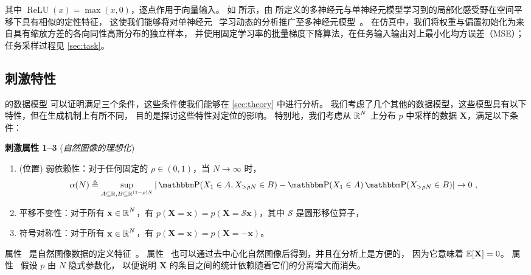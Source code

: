 其中 $\operatorname{ReLU}(x) = \max(x,0)$，逐点作用于向量输入。
如 \textcite{ingrosso2022data} 所示，由  所定义的多神经元与单神经元模型学习到的局部化感受野在空间平移下具有相似的定性特征，
这使我们能够将对单神经元~ 学习动态的分析推广至多神经元模型~。
在仿真中，我们将权重与偏置初始化为来自具有缩放方差的各向同性高斯分布的独立样本，
并使用固定学习率的批量梯度下降算法，在任务输入输出对上最小化均方误差（MSE）；任务采样过程见 \cref{sec:task}。
\subsection{刺激特性}
\label{sec:input}

\textcite{ingrosso2022data} 的数据模型
可以证明满足三个条件，这些条件使我们能够在 \cref{sec:theory} 中进行分析。
我们考虑了几个其他的数据模型，这些模型具有以下特性，但在生成机制上有所不同，
目的是探讨这些特性对定位的影响。
特别地，我们考虑从 $\operatorname{\mathbb{R}}^N$ 上分布 $p$ 中采样的数据 $\mathbf{X}$，满足以下条件：
\begin{stimulus}{\textbf{刺激属性 1--3} (\emph{自然图像的理想化})}{}
\begin{enumerate}[series=propenumi]
  \item \label{item:weak-dependence} (位置) 弱依赖性：对于任何固定的 $\rho \in (0,1)$，当 $N \to \infty$ 时，
    $$\alpha(N) \triangleq \sup_{A \subseteq \R, B \subseteq \R^{(1-\rho) N}} |\PR(X_1 \in A, X_{> \rho N} \in B) - \PR(X_1 \in A) \PR(X_{> \rho N} \in B)| \to 0~,$$
  \item \label{item:translation-invariance} 平移不变性：对于所有 $\mathbf{x} \in \operatorname{\mathbb{R}}^N$，有 $p(\mathbf{X} = \mathbf{x}) = p(\mathbf{X} = \mathcal{S} \mathbf{x})$，其中 $\mathcal{S}$ 是圆形移位算子，
  \item \label{item:sign-symmetry} 符号对称性：对于所有 $\mathbf{x} \in \operatorname{\mathbb{R}}^N$，有 $p(\mathbf{X} = \mathbf{x}) = p(\mathbf{X} = -\mathbf{x})$。
\end{enumerate}
\end{stimulus}
属性~
是自然图像数据的定义特征~\parencite{hyvarinen2009natural}。
属性~
也可以通过去中心化自然图像后得到，并且在分析上是方便的，
因为它意味着 $\operatorname{\mathbb{E}}[\mathbf{X}] = 0$。
属性~ 假设 $p$ 由 $N$ 隐式参数化，
以便说明 $\mathbf{X}$ 的条目之间的统计依赖随着它们的分离增大而消失。\smash{\footnotemark}

